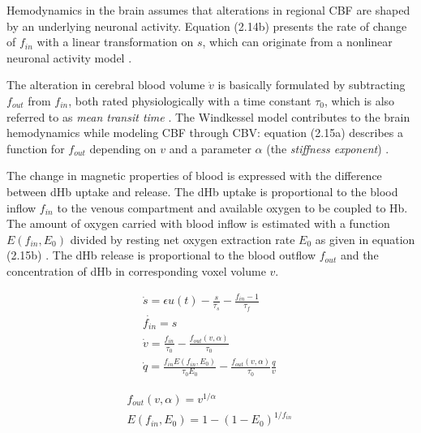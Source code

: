 Hemodynamics in the brain assumes that alterations in regional CBF are shaped by an underlying neuronal activity. Equation (2.14b) presents the rate of change of $f_{in}$ with a linear transformation on $s$, which can originate from a nonlinear neuronal activity model \citep{XYZ00, XYZFR}. 

The alteration in cerebral blood volume $\dot{v}$ is basically formulated by subtracting $f_{out}$ from $f_{in}$, both rated physiologically with a time constant $\tau_0$, which is also referred to as \textit{mean transit time} \citep{XYZ99}. The Windkessel model contributes to the brain hemodynamics while modeling CBF through CBV:  equation (2.15a) describes a function for $f_{out}$ depending on $v$ and a parameter $\alpha$ (the  \textit{stiffness exponent}) \citep{XYZ99}.    

The change in magnetic properties of blood is expressed with the difference between dHb uptake and release. The dHb uptake is proportional to the blood inflow $f_{in}$ to the venous compartment and available oxygen to be coupled to Hb. The amount of oxygen carried with blood inflow is estimated with a function $E(f_{in}, E_0)$ divided by resting net oxygen extraction rate $E_0$ as given in equation (2.15b) \citep{XYZ98}. The dHb release is proportional to the blood outflow $f_{out}$ and the concentration of dHb in corresponding voxel volume $v$.     

\begin{subequations}
 \begin{align} \dot{s} = \epsilon u(t)- \frac{s}{\tau_s} - \frac{f_{in} -1 }{\tau_f}  \label{eqn: frobenius 19}\\  \dot{f_{in}} = s
\label{eqn: frobenius 20} \\ \dot{v} = \frac{f_{in}}{\tau_0} - \frac{f_{out}(v, \alpha)}{\tau_0} 
\label{eqn: frobenius 21} \\ \dot{q} = \frac{f_{in} E(f_{in}, E_0)}{\tau_0 E_0}- \frac{f_{out}(v, \alpha)}{\tau_0}  \frac{q}{v}  
\
\end{align} 
\end{subequations}

\begin{subequations}
 \begin{align} f_{out}(v, \alpha) = v^{1/ \alpha}
 \label{eqn: frobenius 22}\\  E(f_{in} , E_0) = 1- (1-E_0)^{1/f_{in}} \
\end{align} 
\end{subequations}

